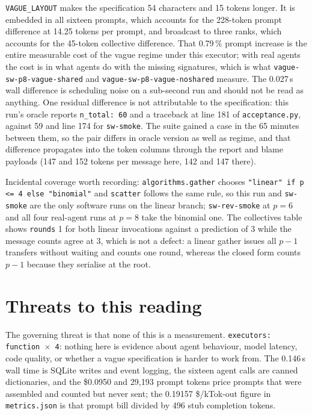 \documentclass[11pt]{article}
\begin{document}
\texttt{VAGUE\_LAYOUT} makes the specification 54 characters and 15 tokens longer. It is
embedded in all sixteen prompts, which accounts for the 228-token prompt difference at 14.25
tokens per prompt, and broadcast to three ranks, which accounts for the 45-token collective
difference. That 0.79\,\% prompt increase is the entire measurable cost of the vague regime
under this executor; with real agents the cost is in what agents do with the missing
signatures, which is what \texttt{vague-sw-p8-vague-shared} and
\texttt{vague-sw-p8-vague-noshared} measure. The 0.027\,s wall difference is scheduling noise
on a sub-second run and should not be read as anything. One residual difference is not
attributable to the specification: this run's oracle reports \texttt{n\_total: 60} and a
traceback at line 181 of \texttt{acceptance.py}, against 59 and line 174 for \texttt{sw-smoke}.
The suite gained a case in the 65 minutes between them, so the pair differs in oracle version
as well as regime, and that difference propagates into the token columns through the report and
blame payloads (147 and 152 tokens per message here, 142 and 147 there).

Incidental coverage worth recording: \texttt{algorithms.gather} chooses
\texttt{"linear" if p <= 4 else "binomial"} and \texttt{scatter} follows the same rule, so this
run and \texttt{sw-smoke} are the only software runs on the linear branch;
\texttt{sw-rev-smoke} at $p = 6$ and all four real-agent runs at $p = 8$ take the binomial one.
The collectives table shows \texttt{rounds} 1 for both linear invocations against a prediction
of 3 while the message counts agree at 3, which is not a defect: a linear gather issues all
$p-1$ transfers without waiting and counts one round, whereas the closed form counts $p-1$
because they serialise at the root.

\section{Threats to this reading}

The governing threat is that none of this is a measurement. \texttt{executors: function
$\times$ 4}: nothing here is evidence about agent behaviour, model latency, code quality, or
whether a vague specification is harder to work from. The 0.146\,s wall time is SQLite writes
and event logging, the sixteen agent calls are canned dictionaries, and the \$0.0950 and
29{,}193 prompt tokens price prompts that were assembled and counted but never sent; the
0.19157 \$/kTok-out figure in \texttt{metrics.json} is that prompt bill divided by 496 stub
completion tokens.
\end{document}
